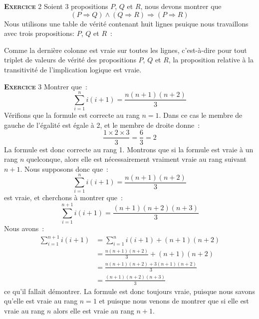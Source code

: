 \documentclass[10pt,a4paper,notitlepage]{article}
\newcommand{\exercice}[1]{\textsc{\textbf{Exercice}} #1}
\begin{document}
\exercice{2} Soient 3 propositions $P$, $Q$ et $R$, nous devons montrer que
\[
  (P\Rightarrow Q) \land (Q\Rightarrow R) \Rightarrow (P\Rightarrow R)
\]
  Nous utilisons une table de vérité contenant huit lignes psuique nous travaillons
  avec trois propositions: $P$, $Q$ et $R$ :
  \begin{table}[H]
    \begin{center}
  \end{center}
  \end{table}
  Comme la dernière colonne est vraie sur toutes les lignes,
  c'est-à-dire pour tout triplet de valeurs de vérité des propositions
  $P$, $Q$ et $R$, la proposition relative à la transitivité de
  l'implication logique est vraie.

\bigskip
  
\exercice{3} Montrer que :
\[
  \sum_{i=1}^n i(i+1) = \frac{n(n+1)(n+2)}{3}
\]
Vérifions que la formule est correcte au rang $n=1$. Dans ce cas le
membre de gauche de l'égalité est égale à 2, et le membre de droite donne :
\[
\frac{1\times 2\times 3}{3} = \frac{6}{3} = 2 
\]
La formule est donc correcte au rang 1. Montrons que si la formule est  vraie à un rang $n$ quelconque, alors elle est nécessairement vraiment vraie au rang suivant $n+1$. Nous supposons donc que :
\[
\sum_{i=1}^n i(i+1) = \frac{n(n+1)(n+2)}{3}
\]
est vraie, et cherchons à montrer que :
\[
\sum_{i=1}^{n+1} i(i+1) = \frac{(n+1)(n+2)(n+3)}{3}
\]
Nous avons :
\[
  \begin{split}
    \sum_{i=1}^{n+1} i(i+1) &= \sum_{i=1}^n i(i+1) + (n+1)(n+2)\\
    &= \frac{n(n+1)(n+2)}{3} + (n+1)(n+2) \\
    &= \frac{n(n+1)(n+2)+3(n+1)(n+2)}{3} \\
    &= \frac{(n+1)(n+2)(n+3)}{3}
  \end{split}
\]
ce qu'il fallait démontrer. La formule est donc toujours vraie,
puisque nous savons qu'elle est vraie au rang $n=1$ et puisque nous
venons de montrer que si elle est vraie au rang $n$ alors elle est vraie au rang $n+1$.
\end{document}
